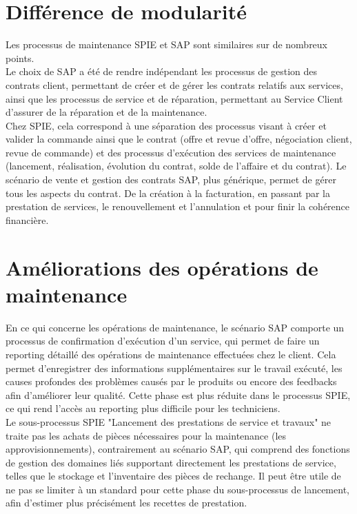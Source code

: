 \section{Différence de modularité}

Les processus de maintenance SPIE et SAP sont similaires sur de nombreux points. \\

Le choix de SAP a été de rendre indépendant les processus de gestion des contrats client, permettant de créer et de gérer les contrats relatifs aux services, ainsi que les processus de service et de réparation, permettant au Service Client d’assurer de la réparation et de la maintenance. \\

Chez SPIE, cela correspond à une séparation des processus visant à créer et valider la commande ainsi que le contrat (offre et revue d’offre, négociation client, revue de commande) et des processus d’exécution des services de maintenance (lancement, réalisation, évolution du contrat, solde de l’affaire et du contrat). Le scénario de vente et gestion des contrats SAP, plus générique, permet de gérer tous les aspects du contrat. De la création à la facturation, en passant par la prestation de services, le renouvellement et l’annulation et pour finir la cohérence financière. \\

\section{Améliorations des opérations de maintenance}

En ce qui concerne les opérations de maintenance, le scénario SAP comporte un processus de confirmation d’exécution d’un service, qui permet de faire un reporting détaillé des opérations de maintenance effectuées chez le client. Cela permet d'enregistrer des informations supplémentaires sur le travail exécuté, les causes profondes des problèmes causés par le produits ou encore des feedbacks afin d’améliorer leur qualité. Cette phase est plus réduite dans le processus SPIE, ce qui rend l’accès au reporting plus difficile pour les techniciens. \\

Le sous-processus SPIE "Lancement des prestations de service et travaux" ne traite pas les achats de pièces nécessaires pour la maintenance (les approvisionnements), contrairement au scénario SAP, qui comprend des fonctions de gestion des domaines liés supportant directement les prestations de service, telles que le stockage et l’inventaire des pièces de rechange. Il peut être utile de ne pas se limiter à un standard pour cette phase du sous-processus de lancement, afin d’estimer plus précisément les recettes de prestation. \\

